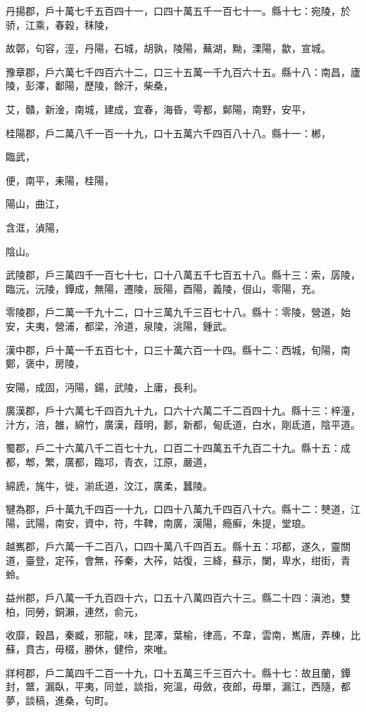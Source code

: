 \begin{pinyinscope}
丹揚郡，戶十萬七千五百四十一，口四十萬五千一百七十一。縣十七：宛陵，於骄，江乘，春穀，秣陵，

故鄣，句容，涇，丹陽，石城，胡孰，陵陽，蕪湖，黝，溧陽，歙，宣城。

豫章郡，戶六萬七千四百六十二，口三十五萬一千九百六十五。縣十八：南昌，廬陵，彭澤，鄱陽，歷陵，餘汗，柴桑，

艾，贛，新淦，南城，建成，宜春，海昏，雩都，鄡陽，南野，安平，

桂陽郡，戶二萬八千一百一十九，口十五萬六千四百八十八。縣十一：郴，

臨武，

便，南平，耒陽，桂陽，

陽山，曲江，

含洭，湞陽，

陰山。

武陵郡，戶三萬四千一百七十七，口十八萬五千七百五十八。縣十三：索，孱陵，臨沅，沅陵，鐔成，無陽，遷陵，辰陽，酉陽，義陵，佷山，零陽，充。

零陵郡，戶二萬一千九十二，口十三萬九千三百七十八。縣十：零陵，營道，始安，夫夷，營浦，都梁，泠道，泉陵，洮陽，鍾武。

漢中郡，戶十萬一千五百七十，口三十萬六百一十四。縣十二：西城，旬陽，南鄭，褒中，房陵，

安陽，成固，沔陽，鍚，武陵，上庸，長利。

廣漢郡，戶十六萬七千四百九十九，口六十六萬二千二百四十九。縣十三：梓潼，汁方，涪，雒，綿竹，廣漢，葭明，郪，新都，甸氐道，白水，剛氐道，陰平道。

蜀郡，戶二十六萬八千二百七十九，口百二十四萬五千九百二十九。縣十五：成都，郫，繁，廣都，臨邛，青衣，江原，嚴道，

綿虒，旄牛，徙，湔氐道，汶江，廣柔，蠶陵。

犍為郡，戶十萬九千四百一十九，口四十八萬九千四百八十六。縣十二：僰道，江陽，武陽，南安，資中，符，牛鞞，南廣，漢陽，瘾癣，朱提，堂琅。

越嶲郡，戶六萬一千二百八，口四十萬八千四百五。縣十五：邛都，遂久，靈關道，臺登，定莋，會無，莋秦，大莋，姑復，三絳，蘇示，闌，卑水，绀街，青蛉。

益州郡，戶八萬一千九百四十六，口五十八萬四百六十三。縣二十四：滇池，雙柏，同勞，銅瀨，連然，俞元，

收靡，穀昌，秦臧，邪龍，味，昆澤，葉榆，律高，不韋，雲南，嶲唐，弄棟，比蘇，賁古，毋棳，勝休，健伶，來唯。

牂柯郡，戶二萬四千二百一十九，口十五萬三千三百六十。縣十七：故且蘭，鐔封，鄨，漏臥，平夷，同並，談指，宛溫，毋斂，夜郎，毋單，漏江，西隨，都夢，談稿，進桑，句町。


\end{pinyinscope}
